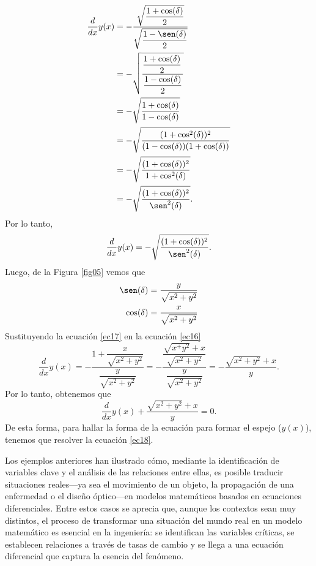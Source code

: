 \begin{example}{}{}
\begin{align*}
        \frac{d}{dx}y(x) & = -\frac{\sqrt{\dfrac{1 + \cos(\delta)}{2}}}{\sqrt{\dfrac{1 - \sen(\delta)}{2}}} \\
        & = -\sqrt{\frac{\dfrac{1 + \cos(\delta)}{2}\,}{\dfrac{1 - \cos(\delta)}{2}}} \\
        & = -\sqrt{\frac{1 + \cos(\delta)}{1 - \cos(\delta)}} \\
        & = -\sqrt{\frac{(1 + \cos^2(\delta))^2}{(1 - \cos(\delta))(1 + \cos(\delta))}} \\
        & = -\sqrt{\frac{(1 + \cos(\delta))^2}{1 + \cos^2(\delta)}} \\
        & = -\sqrt{\frac{(1 + \cos(\delta))^2}{\sen^2(\delta)}}.
    \end{align*}
    Por lo tanto,
    \begin{equation}
        \frac{d}{dx}y(x) = -\sqrt{\frac{(1 + \cos(\delta))^2}{\sen^2(\delta)}}. \label{ec16}
    \end{equation}
    Luego,  de la Figura \ref{fig05} vemos que
    \begin{equation} \label{ec17}
        \begin{aligned}
            \sen(\delta) & = \frac{y}{\sqrt{x^2 + y^2}} \\
            \cos(\delta) & = \frac{x}{\sqrt{x^2 + y^2}}
        \end{aligned}
    \end{equation}
    Sustituyendo la ecuación \eqref{ec17} en la ecuación \eqref{ec16}
    \begin{equation*}
        \frac{d}{dx}y(x) = -\frac{1 + \dfrac{x}{\sqrt{x^2 + y^2}}}{\dfrac{y}{\sqrt{x^2 + y^2}}} = -\frac{\dfrac{\sqrt{x^+ y^2} + x}{\sqrt{x^2 + y^2}}}{\dfrac{y}{\sqrt{x^2 + y^2}}} = -\frac{\sqrt{x^2 + y^2} + x}{y}.
    \end{equation*}
    Por lo tanto, obtenemos que
    \begin{equation}
        \frac{d}{dx}y(x) + \frac{\sqrt{x^2 + y^2} + x}{y} = 0.\label{ec18}
    \end{equation}
    De esta forma, para hallar la forma de la ecuación para formar el espejo ($y(x)$), tenemos que resolver la ecuación \eqref{ec18}.
\end{example}
Los ejemplos anteriores han ilustrado cómo, mediante la identificación de variables clave y el análisis de las relaciones entre ellas, es posible traducir situaciones reales—ya sea el movimiento de un objeto, la propagación de una enfermedad o el diseño óptico—en modelos matemáticos basados en ecuaciones diferenciales. Entre estos casos se aprecia que, aunque los contextos sean muy distintos, el proceso de transformar una situación del mundo real en un modelo matemático es esencial en la ingeniería: se identifican las variables críticas, se establecen relaciones a través de tasas de cambio y se llega a una ecuación diferencial que captura la esencia del fenómeno.

